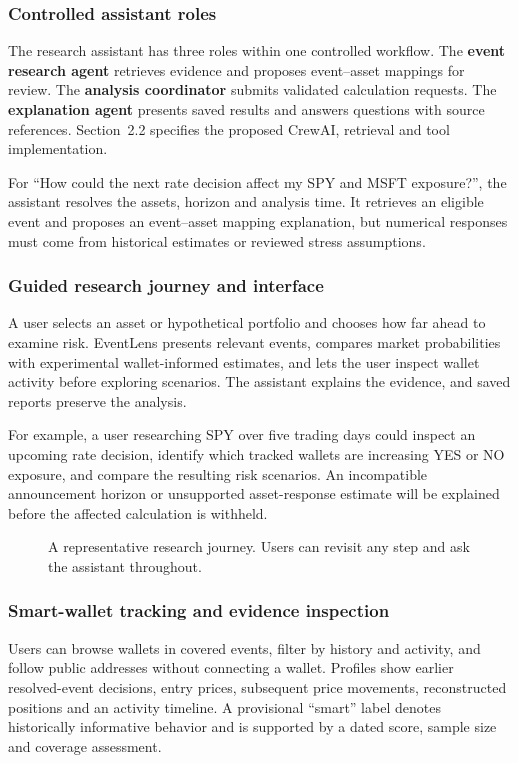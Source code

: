 \subsubsection{Controlled assistant roles}
The research assistant has three roles within one controlled workflow. The \textbf{event research agent} retrieves evidence and proposes event--asset mappings for review. The \textbf{analysis coordinator} submits validated calculation requests. The \textbf{explanation agent} presents saved results and answers questions with source references. Section~2.2 specifies the proposed CrewAI, retrieval and tool implementation.

For ``How could the next rate decision affect my SPY and MSFT exposure?'', the assistant resolves the assets, horizon and analysis time. It retrieves an eligible event and proposes an event--asset mapping explanation, but numerical responses must come from historical estimates or reviewed stress assumptions.

\subsubsection{Guided research journey and interface}
A user selects an asset or hypothetical portfolio and chooses how far ahead to examine risk. EventLens presents relevant events, compares market probabilities with experimental wallet-informed estimates, and lets the user inspect wallet activity before exploring scenarios. The assistant explains the evidence, and saved reports preserve the analysis.

For example, a user researching SPY over five trading days could inspect an upcoming rate decision, identify which tracked wallets are increasing YES or NO exposure, and compare the resulting risk scenarios. An incompatible announcement horizon or unsupported asset-response estimate will be explained before the affected calculation is withheld.

\begin{figure}[H]
\centering

\caption{A representative research journey. Users can revisit any step and ask the assistant throughout.}
\label{fig:user-use-cases}
\end{figure}

\subsubsection{Smart-wallet tracking and evidence inspection}
Users can browse wallets in covered events, filter by history and activity, and follow public addresses without connecting a wallet. Profiles show earlier resolved-event decisions, entry prices, subsequent price movements, reconstructed positions and an activity timeline. A provisional ``smart'' label denotes historically informative behavior and is supported by a dated score, sample size and coverage assessment.

